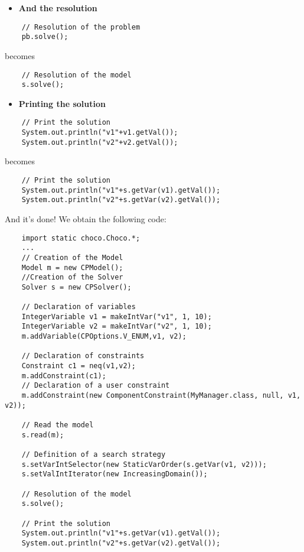 \begin{itemize}
	\item \textbf{And the resolution}
\end{itemize}

\begin{lstlisting}
	// Resolution of the problem
	pb.solve();
\end{lstlisting}
becomes
\begin{lstlisting}
	// Resolution of the model
	s.solve();
\end{lstlisting}

\begin{itemize}
	\item \textbf{Printing the solution}
\end{itemize}

\begin{lstlisting}
	// Print the solution
	System.out.println("v1"+v1.getVal());
	System.out.println("v2"+v2.getVal());
\end{lstlisting}
becomes
\begin{lstlisting}
	// Print the solution
	System.out.println("v1"+s.getVar(v1).getVal());
	System.out.println("v2"+s.getVar(v2).getVal());
\end{lstlisting}

And it's done!
We obtain the following code:
\begin{lstlisting}
	import static choco.Choco.*;
	...
	// Creation of the Model
	Model m = new CPModel();
	//Creation of the Solver
	Solver s = new CPSolver();
	
	// Declaration of variables
	IntegerVariable v1 = makeIntVar("v1", 1, 10);
	IntegerVariable v2 = makeIntVar("v2", 1, 10);
	m.addVariable(CPOptions.V_ENUM,v1, v2);
	
	// Declaration of constraints
	Constraint c1 = neq(v1,v2);
	m.addConstraint(c1);
	// Declaration of a user constraint
	m.addConstraint(new ComponentConstraint(MyManager.class, null, v1, v2));
	
	// Read the model
	s.read(m);
	
	// Definition of a search strategy
	s.setVarIntSelector(new StaticVarOrder(s.getVar(v1, v2)));
	s.setValIntIterator(new IncreasingDomain());
	
	// Resolution of the model
	s.solve();
	
	// Print the solution
	System.out.println("v1"+s.getVar(v1).getVal());
	System.out.println("v2"+s.getVar(v2).getVal());
\end{lstlisting}

